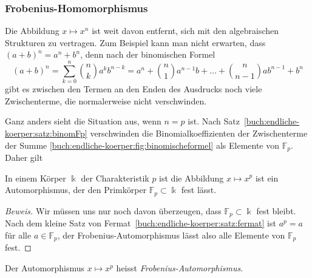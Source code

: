 \subsubsection{Frobenius-Homomorphismus}
Die Abbildung $x\mapsto x^n$ ist weit davon entfernt, sich mit den
algebraischen Strukturen zu vertragen.
Zum Beispiel kann man nicht erwarten, dass $(a+b)^n = a^n + b^n$,
denn nach der binomischen Formel
\begin{equation}
(a+b)^n
=
\sum_{k=0}^n \binom{n}{k} a^k b^{n-k}
=
a^n + \binom{n}{1}a^{n-1}b + \dots + \binom{n}{n-1}ab^{n-1} + b^n
\label{buch:endliche-koerper:fig:binomischeformel}
\end{equation}
gibt es zwischen den Termen an den Enden des Ausdrucks noch viele
Zwischenterme, die normalerweise nicht verschwinden.

Ganz anders sieht die Situation aus, wenn $n=p$ ist.
Nach Satz~\ref{buch:endliche-koerper:satz:binomFp} verschwinden die
Binomialkoeffizienten der Zwischenterme der Summe
\eqref{buch:endliche-koerper:fig:binomischeformel}
als Elemente von $\mathbb{F}_p$.
Daher gilt

\begin{satz}
In einem Körper $\Bbbk$ der Charakteristik $p$ ist die Abbildung
$x\mapsto x^p$ ist ein Automorphismus, der den Primkörper 
$\mathbb{F}_p\subset\Bbbk$ fest lässt.
\end{satz}

\begin{proof}[Beweis]
Wir müssen uns nur noch davon überzeugen, dass $\mathbb{F}_p\subset\Bbbk$
fest bleibt.
Nach dem kleine Satz von Fermat~\ref{buch:endliche-koerper:satz:fermat}
ist $a^p=a$ für alle $a\in\mathbb{F}_p$, der Frobenius-Automorphismus
lässt also alle Elemente von $\mathbb{F}_p$ fest.
\end{proof}

\begin{definition}
Der Automorphismus $x\mapsto x^p$ heisst {\em Frobenius-Automorphismus}.
\end{definition}
